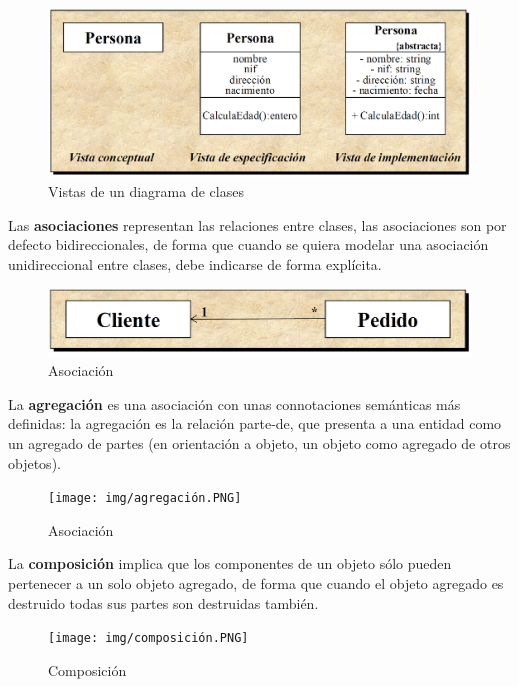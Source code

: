 \documentclass[12pt,letterpaper]{article}
\begin{document}
	\begin{figure}[H]
		\centering
		\includegraphics[scale=0.2]{img/vistas de clase.PNG}     
		\caption{Vistas de un diagrama de clases}
	\label{fig:rc}
	\end{figure} \vspace{1cm}
	
Las \textbf{asociaciones} representan las relaciones entre clases, las asociaciones son por defecto bidireccionales, de forma que cuando se quiera modelar una asociación unidireccional entre clases, debe indicarse de forma explícita.\\ 

	\begin{figure}[H]
		\centering
		\includegraphics[scale=0.2]{img/asociacion.PNG}      
		\caption{Asociación}
	\label{fig:rc}
	\end{figure}
	\vspace{1cm}

La \textbf{agregación} es una asociación con unas connotaciones semánticas más definidas: la agregación es la relación parte-de, que presenta a una entidad como un agregado de partes (en orientación a objeto, un objeto como agregado de otros objetos).

	\begin{figure}[H]
		\centering
		\texttt{[image: img/agregación.PNG]}       
		\caption{Asociación}
	\label{fig:rc}
	\end{figure}
	\vspace{1cm}
	
La \textbf{composición} implica que los componentes de un objeto sólo pueden pertenecer a un solo objeto agregado, de forma que cuando el objeto agregado es destruido todas sus partes son destruidas también.\\
	\begin{figure}[H]
		\centering
		\texttt{[image: img/composición.PNG]}     
		\caption{Composición}
	\label{fig:rc}
	\end{figure}
	\vspace{1cm}
\end{document}
